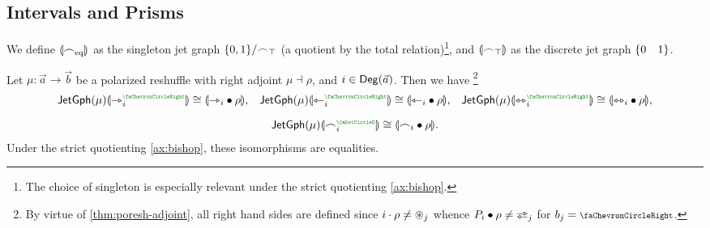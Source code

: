 \documentclass[a4paper]{memoir}
\begin{document}
\subsection{Intervals and Prisms}
\begin{definition} \label{def:interval-eqty} \label{def:interval-top}
	We define ${\llparenthesis {\frown}_{\mathrm{eq}} \rrparenthesis}$ as the singleton jet graph $\mathopen{}\left\{ 0, 1 \right\}\mathclose{}/{\frown}_\top$ (a quotient by the total relation)\footnote{The choice of singleton is especially relevant under the strict quotienting \cref{ax:bishop}.}, and ${\llparenthesis {\frown}_\top \rrparenthesis}$ as the discrete jet graph $\mathopen{}\left\{ 0 \quad 1 \right\}\mathclose{}$.
\end{definition}
\begin{proposition} \label{thm:poresh-jetgph-intervals}
	Let $\mu : \vec a \to \vec b$ be a polarized reshuffle with right adjoint $\mu \dashv \rho$, and $i \in {\mathsf{Deg}}(\vec a)$. Then we have%
	\footnote{By virtue of \cref{thm:poresh-adjoint}, all right hand sides are defined since $i \cdot \rho \neq {\oast}_j$ whence $P_i \oriof \rho \neq \infrajetsym_j$ for $b_j = \ypolar$.}
	\begin{equation}
		\begin{array}{c c c}
			\jetgph{\mu} \rival{\jetsym_i\pmry} \cong \rival{\jetsym_i \oriof \rho},
			& \jetgph{\mu} \rival{\tejsym_i\pmry} \cong \rival{\tejsym_i \oriof \rho},
			& \jetgph{\mu} \rival{\equijetsym_i\pmry} \cong \rival{\equijetsym_i \oriof \rho},
			\\[1em]
			& \jetgph{\mu} \rival{\edgesym_i\pmrn} \cong \rival{\edgesym_i \oriof \rho}.
		\end{array}
		\label{eq:poresh-jetgph-intervals}
	\end{equation}
	Under the strict quotienting \cref{ax:bishop}, these isomorphisms are equalities.
\end{proposition}
\end{document}
